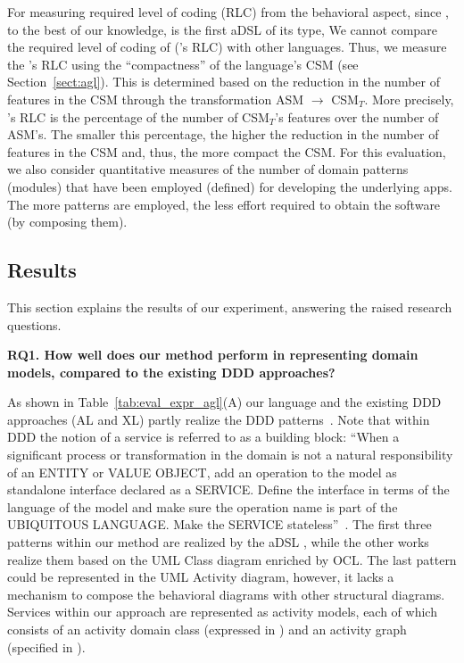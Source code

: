 For measuring required level of coding (RLC) from the behavioral aspect, since \agl, to the best of our knowledge, is the first aDSL of its type, We cannot compare the required level of coding of \agl (\agl's RLC) with other languages. Thus, we measure the \agl's RLC using the ``compactness'' of the language's CSM (see Section~\ref{sect:agl}). This is determined based on the reduction in the number of features in the CSM through the transformation ASM $\rightarrow$ CSM$_T$. More precisely, \agl's RLC is the percentage of the number of CSM$_T$'s features over the number of ASM's. The smaller this percentage, the higher the reduction in the number of features in the CSM and, thus, the more compact the CSM. For this evaluation, we also consider quantitative measures of the number of domain patterns (modules) that have been employed (defined) for developing the underlying apps. The more patterns are employed, the less effort required to obtain the software (by composing them).

\subsection{Results}
\label{subsect:results} 

This section explains the results of our experiment, answering the raised research questions.

\label{sect:eval-expressiveness}

\noindent \textbf{RQ1. How well does our method perform in representing domain models, compared to the existing DDD approaches?}	

As shown in Table~\ref{tab:eval_expr_agl}(A) our language and the existing DDD approaches (AL and XL) partly realize the DDD patterns~\cite{evans_domain-driven_2004}. Note that within DDD the notion of a service is referred to as a building block: ``When a significant process or transformation in the domain is not a natural responsibility of an ENTITY or VALUE OBJECT, add an operation to the model as standalone interface declared as a SERVICE. Define the interface in terms of the language of the model and make sure the operation name is part of the UBIQUITOUS LANGUAGE. Make the SERVICE stateless''~\cite{evans_domain-driven_2004}. The first three patterns within our method are realized by the aDSL \dcsl, while the other works realize them based on the UML Class diagram enriched by OCL. The last pattern could be represented in the UML Activity diagram, however, it lacks a mechanism to compose the behavioral diagrams with other structural diagrams. Services within our approach are represented as activity models, each of which consists of an activity domain class (expressed in \dcsl) and an activity graph (specified in \agl).

